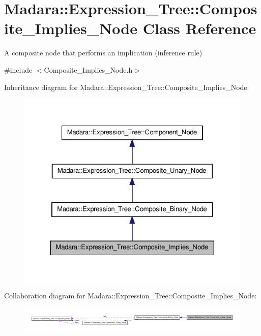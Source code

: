 \hypertarget{classMadara_1_1Expression__Tree_1_1Composite__Implies__Node}{
\section{Madara::Expression\_\-Tree::Composite\_\-Implies\_\-Node Class Reference}
\label{d4/d4d/classMadara_1_1Expression__Tree_1_1Composite__Implies__Node}
}


A composite node that performs an implication (inference rule)  




{\ttfamily \#include $<$Composite\_\-Implies\_\-Node.h$>$}



Inheritance diagram for Madara::Expression\_\-Tree::Composite\_\-Implies\_\-Node:
\nopagebreak
\begin{figure}[H]
\begin{center}
\leavevmode
\includegraphics[width=326pt]{d2/d13/classMadara_1_1Expression__Tree_1_1Composite__Implies__Node__inherit__graph}
\end{center}
\end{figure}


Collaboration diagram for Madara::Expression\_\-Tree::Composite\_\-Implies\_\-Node:
\nopagebreak
\begin{figure}[H]
\begin{center}
\leavevmode
\includegraphics[width=400pt]{d1/d19/classMadara_1_1Expression__Tree_1_1Composite__Implies__Node__coll__graph}
\end{center}
\end{figure}
